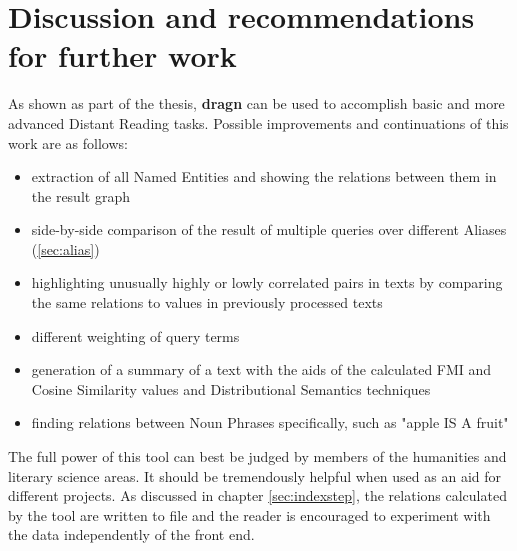 \section{Discussion and recommendations for further work}
\label{sec:furtherwork}
As shown as part of the thesis, \textbf{dragn} can be used to accomplish basic and more advanced Distant Reading tasks. Possible improvements and continuations of this work are as follows:
\begin{itemize}
\item extraction of all Named Entities and showing the relations between them in the result graph
\item side-by-side comparison of the result of multiple queries over different Aliases (\ref{sec:alias})
\item highlighting unusually highly or lowly correlated pairs in texts by comparing the same relations to values in previously processed texts
\item different weighting of query terms
\item generation of a summary of a text with the aids of the calculated FMI and Cosine Similarity values and Distributional Semantics techniques
\item finding relations between Noun Phrases specifically, such as "apple IS A fruit"
\end{itemize}
The full power of this tool can best be judged by members of the humanities and literary science areas. It should be tremendously helpful when used as an aid for different projects. As discussed in chapter \ref{sec:indexstep}, the relations calculated by the tool are written to file and the reader is encouraged to experiment with the data independently of the front end.
